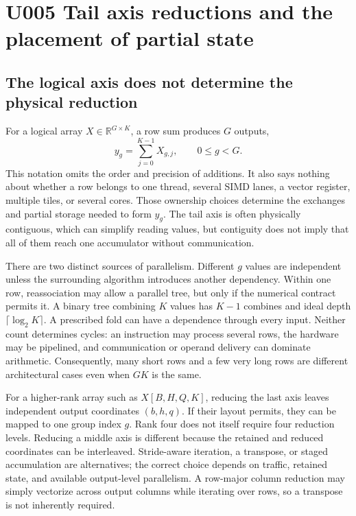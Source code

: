 \section{U005 Tail axis reductions and the placement of partial state}
\label{sec:u005}

\subsection{The logical axis does not determine the physical reduction}

For a logical array $X\in\mathbb{R}^{G\times K}$, a row sum produces $G$ outputs,
\begin{equation}
 y_g=\sum_{j=0}^{K-1}X_{g,j},\qquad 0\leq g<G.
 \label{eq:u005-logical}
\end{equation}
This notation omits the order and precision of additions. It also says nothing about whether a row belongs to one thread, several SIMD lanes, a vector register, multiple tiles, or several cores. Those ownership choices determine the exchanges and partial storage needed to form $y_g$. The tail axis is often physically contiguous, which can simplify reading values, but contiguity does not imply that all of them reach one accumulator without communication.

There are two distinct sources of parallelism. Different $g$ values are independent unless the surrounding algorithm introduces another dependency. Within one row, reassociation may allow a parallel tree, but only if the numerical contract permits it. A binary tree combining $K$ values has $K-1$ combines and ideal depth $\lceil\log_2K\rceil$. A prescribed fold can have a dependence through every input. Neither count determines cycles: an instruction may process several rows, the hardware may be pipelined, and communication or operand delivery can dominate arithmetic. Consequently, many short rows and a few very long rows are different architectural cases even when $GK$ is the same.

For a higher-rank array such as $X[B,H,Q,K]$, reducing the last axis leaves independent output coordinates $(b,h,q)$. If their layout permits, they can be mapped to one group index $g$. Rank four does not itself require four reduction levels. Reducing a middle axis is different because the retained and reduced coordinates can be interleaved. Stride-aware iteration, a transpose, or staged accumulation are alternatives; the correct choice depends on traffic, retained state, and available output-level parallelism. A row-major column reduction may simply vectorize across output columns while iterating over rows, so a transpose is not inherently required.

